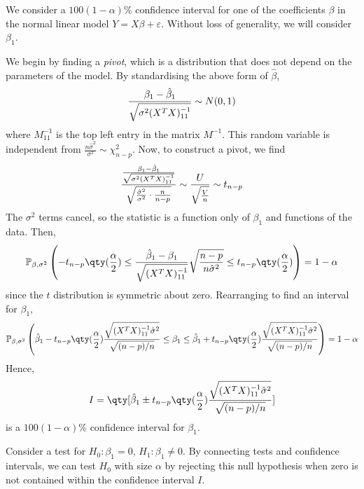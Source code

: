 \begin{example}
	We consider a $100(1-\alpha)\%$ confidence interval for one of the coefficients $\beta$ in the normal linear model $Y = X\beta + \varepsilon$.
	Without loss of generality, we will consider $\beta_1$.

	We begin by finding a \textit{pivot}, which is a distribution that does not depend on the parameters of the model.
	By standardising the above form of $\hat \beta$,
	\begin{align*}
		\frac{\beta_1 - \hat \beta_1}{\sqrt{\sigma^2(X^T X)^{-1}_{11}}} \sim N(0,1)
	\end{align*}
	where $M^{-1}_{11}$ is the top left entry in the matrix $M^{-1}$.
	This random variable is independent from $\frac{n\hat \sigma^2}{\sigma^2} \sim \chi^2_{n-p}$.
	Now, to construct a pivot, we find
	\begin{align*}
		\frac{\frac{\beta_1 - \hat \beta_1}{\sqrt{\sigma^2(X^T X)^{-1}_{11}}}}{\sqrt{\frac{\hat \sigma^2}{\sigma^2} \cdot \frac{n}{n-p}}} \sim \frac{U}{\sqrt{\frac{V}{n}}} \sim t_{n-p}
	\end{align*}
	The $\sigma^2$ terms cancel, so the statistic is a function only of $\beta_1$ and functions of the data.
	Then,
	\begin{align*}
		\psub{\beta,\sigma^2}{ -t_{n-p}\qty(\frac{\alpha}{2}) \leq \frac{\hat \beta_1 - \beta_1}{\sqrt{(X^\tran X)^{-1}_{11}}} \sqrt{\frac{n-p}{n\hat\sigma^2}} \leq t_{n-p}\qty(\frac{\alpha}{2}) } = 1-\alpha
	\end{align*}
	since the $t$ distribution is symmetric about zero.
	Rearranging to find an interval for $\beta_1$,
	\begin{align*}
		\psub{\beta,\sigma^2}{
			\hat \beta_1 - t_{n-p}\qty(\frac{\alpha}{2}) \frac{\sqrt{(X^\tran X)^{-1}_{11} \hat\sigma^2}}{\sqrt{(n-p)/n}}
			\leq \beta_1 \leq
			\hat \beta_1 + t_{n-p}\qty(\frac{\alpha}{2}) \frac{\sqrt{(X^\tran X)^{-1}_{11} \hat\sigma^2}}{\sqrt{(n-p)/n}}
		} = 1-\alpha
	\end{align*}
	Hence,
	\begin{align*}
		I = \qty[\hat \beta_1 \pm t_{n-p}\qty(\frac{\alpha}{2}) \frac{\sqrt{(X^\tran X)^{-1}_{11} \hat \sigma^2}}{\sqrt{(n-p)/n}} ]
	\end{align*}
	is a $100(1-\alpha)\%$ confidence interval for $\beta_1$.

	Consider a test for $H_0 \colon \beta_1 = 0$, $H_1 \colon \beta_1 \neq 0$.
	By connecting tests and confidence intervals, we can test $H_0$ with size $\alpha$ by rejecting this null hypothesis when zero is not contained within the confidence interval $I$.


\end{example}
